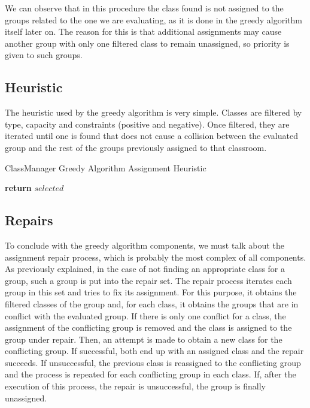 We can observe that in this procedure the class found is not assigned to the groups related to the one we are evaluating, as it is done in the greedy algorithm itself later on. The reason for this is that additional assignments may cause another group with only one filtered class to remain unassigned, so priority is given to such groups.


\subsection{Heuristic}

The heuristic used by the greedy algorithm is very simple. Classes are filtered by type, capacity and constraints (positive and negative). Once filtered, they are iterated until one is found that does not cause a collision between the evaluated group and the rest of the groups previously assigned to that classroom.

\begin{algorithm}[H]
    \caption{ClassManager Greedy Algorithm Assignment Heuristic}
    \begin{algorithmic}[1]
                 
                \EndIf
            \EndFor
            \State \textbf{return} $selected$
        \EndProcedure
    \end{algorithmic}
\end{algorithm}


\subsection{Repairs}

To conclude with the greedy algorithm components, we must talk about the assignment repair process, which is probably the most complex of all components. As previously explained, in the case of not finding an appropriate class for a group, such a group is put into the repair set. The repair process iterates each group in this set and tries to fix its assignment. For this purpose, it obtains the filtered classes of the group and, for each class, it obtains the groups that are in conflict with the evaluated group. If there is only one conflict for a class, the assignment of the conflicting group is removed and the class is assigned to the group under repair. Then, an attempt is made to obtain a new class for the conflicting group. If successful, both end up with an assigned class and the repair succeeds. If unsuccessful, the previous class is reassigned to the conflicting group and the process is repeated for each conflicting group in each class. If, after the execution of this process, the repair is unsuccessful, the group is finally unassigned.

